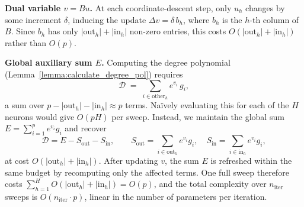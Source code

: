 \documentclass{article}
\theoremstyle{plain}
\theoremstyle{definition}
\theoremstyle{remark}
\newcommand{\Dh}{\mathcal{D}}
\begin{document}
\textbf{Dual variable $v = Bu$.}
At each coordinate-descent step, only $u_h$ changes by some increment $\delta$, inducing the update $\Delta v = \delta \, b_h$, where $b_h$ is the $h$-th column of $B$. Since $b_h$ has only $|\mathrm{out}_h|+|\mathrm{in}_h|$ non-zero entries, this costs $O(|\mathrm{out}_h|+|\mathrm{in}_h|)$ rather than $O(p)$.

\textbf{Global auxiliary sum $E$.}
Computing the degree polynomial (Lemma~\ref{lemma:calculate_degree_pol}) requires
\[
  \Dh
  \;=\; \sum_{i \in \mathrm{other}_h} e^{v_i}\, g_i,
\]
a sum over $p - |\mathrm{out}_h| - |\mathrm{in}_h| \approx p$ terms.
Naïvely evaluating this for each of the $H$ neurons would give $O(pH)$ per sweep.
Instead, we maintain the global sum $E = \sum_{i=1}^{p} e^{v_i} g_i$ and recover
\[
  \Dh = E - S_{\mathrm{out}} - S_{\mathrm{in}},
  \qquad
  S_{\mathrm{out}} = \sum_{i \in \mathrm{out}_h} e^{v_i} g_i, \quad
  S_{\mathrm{in}}  = \sum_{i \in \mathrm{in}_h}  e^{v_i} g_i,
\]
at cost $O(|\mathrm{out}_h|+|\mathrm{in}_h|)$. After updating $v$, the sum $E$ is
refreshed within the same budget by recomputing only the affected terms.
One full sweep therefore costs
$\sum_{h=1}^H O(|\mathrm{out}_h|+|\mathrm{in}_h|) = O(p)$,
and the total complexity over $n_{\mathrm{iter}}$ sweeps is
$O(n_{\mathrm{iter}} \cdot p)$, linear in the number of parameters per iteration.
\end{document}
